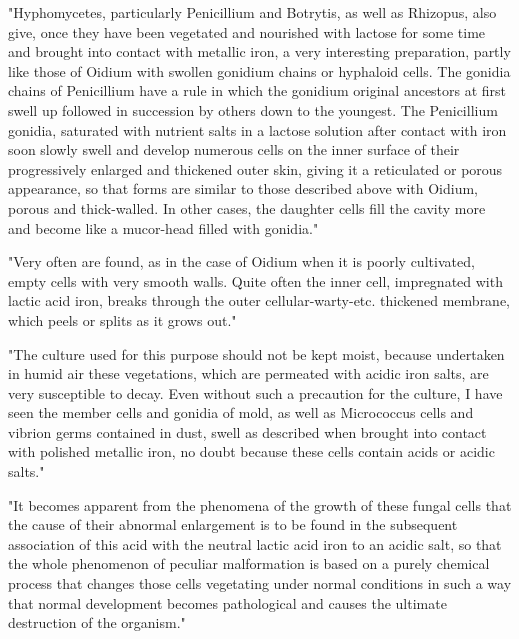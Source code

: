 \documentclass[a4paper, 11pt, oneside]{article}
\begin{document}
"Hyphomycetes, particularly Penicillium and Botrytis, as well as Rhizopus, also give, once they have been vegetated and nourished with lactose for some time and brought into contact with metallic iron, a very interesting preparation, partly like those of Oidium with swollen gonidium chains or hyphaloid cells. The gonidia chains of Penicillium have a rule in which the gonidium original ancestors at first swell up followed in succession by others down to the youngest. The Penicillium gonidia, saturated with nutrient salts in a lactose solution after contact with iron soon slowly swell and develop numerous cells on the inner surface of their progressively enlarged and thickened outer skin, giving it a reticulated or porous appearance, so that forms are similar to those described above with Oidium, porous and thick-walled. In other cases, the daughter cells fill the cavity more and become like a mucor-head filled with gonidia."

"Very often are found, as in the case of Oidium when it is poorly cultivated, empty cells with very smooth walls. Quite often the inner cell, impregnated with lactic acid iron, breaks through the outer cellular-warty-etc. thickened membrane, which peels or splits as it grows out."

"The culture used for this purpose should not be kept moist, because undertaken in humid air these vegetations, which are permeated with acidic iron salts, are very susceptible to decay. Even without such a precaution for the culture, I have seen the member cells and gonidia of mold, as well as Micrococcus cells and vibrion germs contained in dust, swell as described when brought into contact with polished metallic iron, no doubt because these cells contain acids or acidic salts."

"It becomes apparent from the phenomena of the growth of these fungal cells that the cause of their abnormal enlargement is to be found in the subsequent association of this acid with the neutral lactic acid iron to an acidic salt, so that the whole phenomenon of peculiar malformation is based on a purely chemical process that changes those cells vegetating under normal conditions in such a way that normal development becomes pathological and causes the ultimate destruction of the organism."
\end{document}

